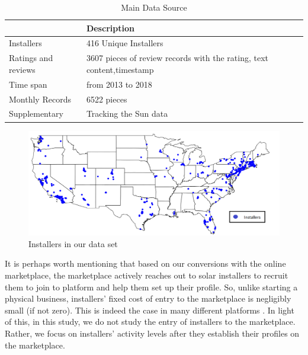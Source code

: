 \documentclass[msom,blindrev]{informs3}
\begin{document}
\begin{table}[]
\centering
\begin{tabular}{@{}ll@{}}
\toprule
           & Description           \\ \midrule
Installers & 416 Unique Installers \\
Ratings and reviews & 3607 pieces of review records with the rating, text content,timestamp \\
Time span  & from 2013 to 2018     \\
Monthly Records & 6522 pieces \\
Supplementary & Tracking the Sun data \\
\bottomrule
\end{tabular}
\caption{Main Data Source}
\label{brief_data_desc}
\end{table}






\begin{figure}
	\centering
	\includegraphics[width=1.1\linewidth]{national_installers.png}
	\caption{Installers in our data set}
	\label{fig:nationalinstallers}
\end{figure}

It is perhaps worth mentioning that based on our conversions with the online marketplace, the marketplace actively reaches out to solar installers to recruit them to join to platform and help them set up their profile. So, unlike starting a physical business, installers' fixed cost of entry to the marketplace is negligibly small (if not zero). This is indeed the case in many different platforms \citep{haddad2015consumer}. In light of this, in this study, we do not study the entry of installers to the marketplace. Rather, we focus on installers' activity levels after they establish their profiles on the marketplace.


\end{document}
